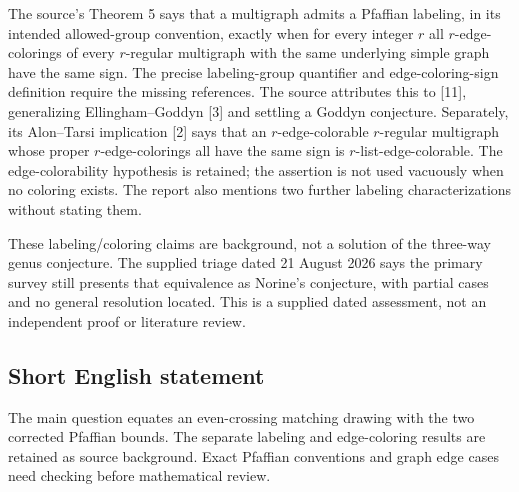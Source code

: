 \documentclass[11pt]{article}
\begin{document}
The source's Theorem 5 says that a multigraph admits a Pfaffian labeling, in its intended allowed-group convention, exactly when for every integer \(r\) all \(r\)-edge-colorings of every \(r\)-regular multigraph with the same underlying simple graph have the same sign. The precise labeling-group quantifier and edge-coloring-sign definition require the missing references. The source attributes this to [11], generalizing Ellingham--Goddyn [3] and settling a Goddyn conjecture. Separately, its Alon--Tarsi implication [2] says that an \(r\)-edge-colorable \(r\)-regular multigraph whose proper \(r\)-edge-colorings all have the same sign is \(r\)-list-edge-colorable. The edge-colorability hypothesis is retained; the assertion is not used vacuously when no coloring exists. The report also mentions two further labeling characterizations without stating them.

These labeling/coloring claims are background, not a solution of the three-way genus conjecture. The supplied triage dated 21 August 2026 says the primary survey still presents that equivalence as Norine's conjecture, with partial cases and no general resolution located. This is a supplied dated assessment, not an independent proof or literature review.
\subsection{Short English statement}
The main question equates an even-crossing matching drawing with the two corrected Pfaffian bounds. The separate labeling and edge-coloring results are retained as source background. Exact Pfaffian conventions and graph edge cases need checking before mathematical review.
\end{document}
